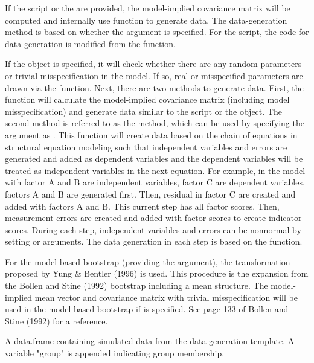 \documentclass[a4paper]{book}
\begin{document}
\begin{Details}\relax
If the  script or the  are provided, the model-implied covariance matrix will be computed and internally use  function to generate data. The data-generation method is based on whether the  argument is specified. For the  script, the code for data generation is modified from the  function.

If the  object is specified, it will check whether there are any random parameters or trivial misspecification in the model. If so, real or misspecified parameters are drawn via the  function. Next, there are two methods to generate data. First, the function will calculate the model-implied covariance matrix (including model misspecification) and generate data similar to the  script or the  object. The second method is referred to as the  method, which can be used by specifying the  argument as . This function will create data based on the chain of equations in structural equation modeling such that independent variables and errors are generated and added as dependent variables and the dependent variables will be treated as independent variables in the next equation. For example, in the model with factor A and B are independent variables, factor C are dependent variables, factors A and B are generated first. Then, residual in factor C are created and added with factors A and B. This current step has all factor scores. Then, measurement errors are created and added with factor scores to create indicator scores. During each step, independent variables and errors can be nonnormal by setting  or  arguments. The data generation in each step is based on the  function.

For the model-based bootstrap (providing the  argument), the transformation proposed by Yung \& Bentler (1996) is used. This procedure is the expansion from the Bollen and Stine (1992) bootstrap including a mean structure. The model-implied mean vector and covariance matrix with trivial misspecification will be used in the model-based bootstrap if  is specified. See page 133 of Bollen and Stine (1992) for a reference. 
\end{Details}
%
\begin{Value}
A data.frame containing simulated data from the data generation template. A variable "group" is appended indicating group membership.
\end{Value}
\end{document}
